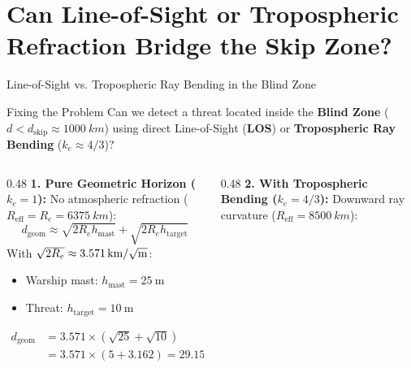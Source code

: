 \documentclass[aspectratio=169, 10pt]{beamer}
\newcommand{\km}{km} %
\begin{document}
\section{Can Line-of-Sight or Tropospheric Refraction Bridge the Skip Zone?}

\begin{frame}{Line-of-Sight vs. Tropospheric Ray Bending in the Blind Zone}
\small
    \begin{block}{Fixing the Problem}
        Can we detect a threat located inside the \textbf{Blind Zone} ($d < d_{\text{skip}} \approx \SI{1000}{\km}$) using direct Line-of-Sight (\textbf{LOS}) or \textbf{Tropospheric Ray Bending} ($k_e \approx 4/3$)?
    \end{block}
    \vspace{-0.4em}
    \begin{columns}[T]
        \begin{column}{0.48\textwidth}
            \textbf{1. Pure Geometric Horizon ($k_e = 1$):}
            No atmospheric refraction ($R_{\text{eff}} = R_e = \SI{6375}{\km}$):
            \begin{equation}
                d_{\text{geom}} \approx \sqrt{2 R_e h_{\text{mast}}} + \sqrt{2 R_e h_{\text{target}}}
            \end{equation}
            With $\sqrt{2 R_e} \approx \SI{3.571}{\km\per\sqrt{\m}}$:
            \begin{itemize}
                \item Warship mast: $h_{\text{mast}} = \SI{25}{\m}$
                \item Threat: $h_{\text{target}} = \SI{10}{\m}$
            \end{itemize}
            \begin{align}
                d_{\text{geom}} &= 3.571 \times \left(\sqrt{25} + \sqrt{10}\right) \nonumber \\
                &= 3.571 \times (5 + 3.162) = \mathbf{29.15\,\si{\km}}
            \end{align}
        \end{column}
        \begin{column}{0.48\textwidth}
            \textbf{2. With Tropospheric Bending ($k_e = 4/3$):}
            Downward ray curvature ($R_{\text{eff}} = \SI{8500}{\km}$):
            \begin{equation}

\end{equation}
\end{column}
\end{columns}
\end{frame}
\end{document}
